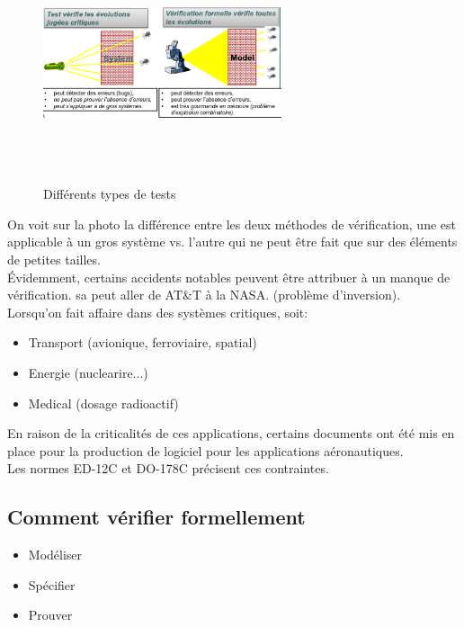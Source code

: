 \documentclass[oneside]{book}
\begin{document}
    \begin{figure}[!ht]
    	\centering
    	\includegraphics[width = 7cm, height = 7cm, keepaspectratio]{Images/types_tests.png}
    	\caption{Différents types de tests}
    	\label{fig:TypesTests}
    \end{figure}
    
    On voit sur la photo la différence entre les deux méthodes de vérification, une est applicable à un gros système vs. l'autre qui ne peut être fait que sur des éléments de petites tailles.\\
    
    Évidemment, certains accidents notables peuvent être attribuer à un manque de vérification. sa peut aller de AT\&T à la NASA. (problème d'inversion).\\
    
    Lorsqu'on fait affaire dans des systèmes critiques, soit:
    \begin{itemize}
        \item Transport (avionique, ferroviaire, spatial)
        \item Energie (nuclearire...)
        \item Medical (dosage radioactif)
    \end{itemize}

    En raison de la criticalités de ces applications, certains documents ont été mis en place pour la production de logiciel pour les applications aéronautiques.\\
    
    Les normes ED-12C et DO-178C précisent ces contraintes.\\
    
    \subsection{Comment vérifier formellement}
    \begin{itemize}
        \item Modéliser
        \item Spécifier
        \item Prouver
    \end{itemize}
\end{document}
